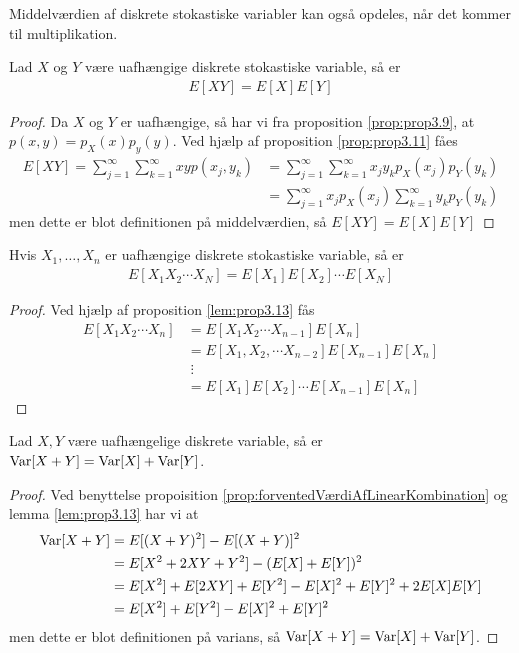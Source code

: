 Middelværdien af diskrete stokastiske variabler kan også opdeles, når det kommer til multiplikation.  
\begin{lem} \label{lem:prop3.13} %
    Lad $X$ og $Y$ være uafhængige diskrete stokastiske variable, så er 
    \begin{align*}
        E[XY]=E[X]E[Y]
    \end{align*}
\end{lem}
\begin{proof}
    Da $X$ og $Y$ er uafhængige, så har vi fra proposition \ref{prop:prop3.9}, at $p(x,y)=p_X(x)p_y(y)$. Ved hjælp af proposition \ref{prop:prop3.11} fåes
    \begin{align*}
        E[XY]=\sum_{j=1}^\infty\sum_{k=1}^\infty xyp(x_j,y_k)&=\sum_{j=1}^\infty\sum_{k=1}^\infty x_jy_kp_X(x_j)p_Y(y_k)\\ &=\sum_{j=1}^\infty x_jp_X(x_j)\sum_{k=1}^\infty y_kp_Y(y_k)
    \end{align*}
    men dette er blot definitionen på middelværdien, så $E[XY] = E[X]E[Y]$
\end{proof}

\begin{prop} \label{prop:prop3.15} %
    Hvis $X_1,\ldots, X_n$ er uafhængige diskrete stokastiske variable, så er
\begin{align*}
    E[X_1X_2\cdots X_N]=E[X_1]E[X_2]\cdots E[X_N]
\end{align*}
\end{prop}
\begin{proof}
Ved hjælp af proposition \ref{lem:prop3.13} fås
    \begin{align*}
        E[X_1X_2\cdots X_n]
        &=E[X_1X_2\cdots X_{n-1}]E[X_n]
        \\
        &=E[X_1,X_2,\cdots X_{n-2}]E[X_{n-1}]E[X_n]\\
        &\; \vdots \\
        &=E[X_1]E[X_2]\cdots E[X_{n-1}]E[X_n]
    \end{align*}
\end{proof}

\begin{prop}\label{prop:variansAfX+Y}
Lad $X, Y$ være uafhængelige diskrete variable, så er $\textnormal{Var}[X + Y] = \textnormal{Var}[X] + \textnormal{Var}[Y]$.
\end{prop}
\begin{proof}
  Ved benyttelse propoisition \ref{prop:forventedVærdiAfLinearKombination} og lemma \ref{lem:prop3.13} har vi at
  \begin{align*}
    \textnormal{Var}[X + Y] &= E[(X + Y)^{2}] - E[(X + Y)]^{2} \\
                &= E[X^{2} + 2XY + Y^{2}] - (E[X] + E[Y])^{2} \\
                &= E[X^{2}] + E[2XY] + E[Y^{2}] - E[X]^{2} + E[Y]^{2} + 2E[X]E[Y]\\
                &= E[X^{2}] + E[Y^{2}] - E[X]^{2} + E[Y]^{2}
  \end{align*}
  men dette er blot definitionen på varians, så $\textnormal{Var}[X + Y] = \textnormal{Var}[X] + \textnormal{Var}[Y]$.
\end{proof}


